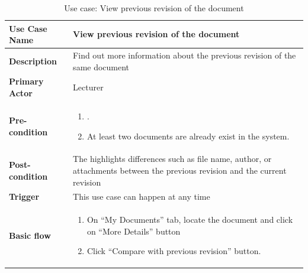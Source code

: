 \begin{table}
	\centering
	\caption{Use case: View previous revision of the document}
	\begin{tabular}{|l|L{9cm}|}
		\hline
		\textbf{Use Case Name} & View previous revision of the document \\
		\hline
		
		\textbf{Description} & Find out more information about the previous revision of the same document \\
		\textbf{Primary Actor} & Lecturer \\
		\textbf{Pre-condition} & 
		\begin{enumerate}
			\item \alreadylogin.
			\item At least two documents are already exist in the system.
		\end{enumerate} \\
		\textbf{Post-condition} & The highlights differences such as file name, author, or attachments between the previous revision and the current revision \\
		\textbf{Trigger} & This use case can happen at any time \\
		\textbf{Basic flow} & 
		\begin{enumerate}
			\item On \enquote{My Documents} tab, locate the document and click on \enquote{More Details} button
			\item Click \enquote{Compare with previous revision} button.
		\end{enumerate} \\
		\hline
	\end{tabular}
\end{table}


